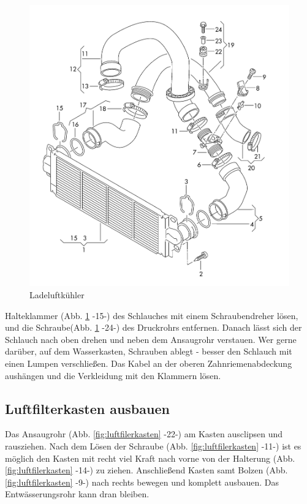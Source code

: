 \documentclass[twoside,a4paper]{refart}
\begin{document}
\begin{figure}[htb]
	\begin{center}
		\includegraphics[width=\textwidth]{Ladeluftkuehler}
		\caption{Ladeluftkühler}
		\label{fig:ladeluftkuehler}
	\end{center}
\end{figure}
Halteklammer (Abb. \ref{fig:ladeluftkuehler} -15-) des Schlauches mit einem Schraubendreher lösen, und die Schraube(Abb. \ref{fig:ladeluftkuehler} -24-) des Druckrohrs entfernen. Danach lässt sich der Schlauch nach oben drehen und neben dem Ansaugrohr verstauen. Wer gerne darüber, auf dem Wasserkasten, Schrauben ablegt - besser den Schlauch mit einen Lumpen verschließen.  
Das Kabel an der oberen Zahnriemenabdeckung aushängen und die Verkleidung mit den Klammern lösen.
 
\newpage
\subsection{Luftfilterkasten ausbauen}
Das Ansaugrohr (Abb. \ref{fig:luftfilerkasten} -22-) am Kasten ausclipsen und rausziehen. Nach dem Lösen der Schraube (Abb. \ref{fig:luftfilerkasten} -11-) ist es möglich den Kasten mit recht viel Kraft nach vorne von der Halterung (Abb. \ref{fig:luftfilerkasten} -14-) zu ziehen. Anschließend Kasten samt Bolzen (Abb. \ref{fig:luftfilerkasten} -9-) nach rechts bewegen und komplett ausbauen. Das Entwässerungsrohr kann dran bleiben.
\end{document}
